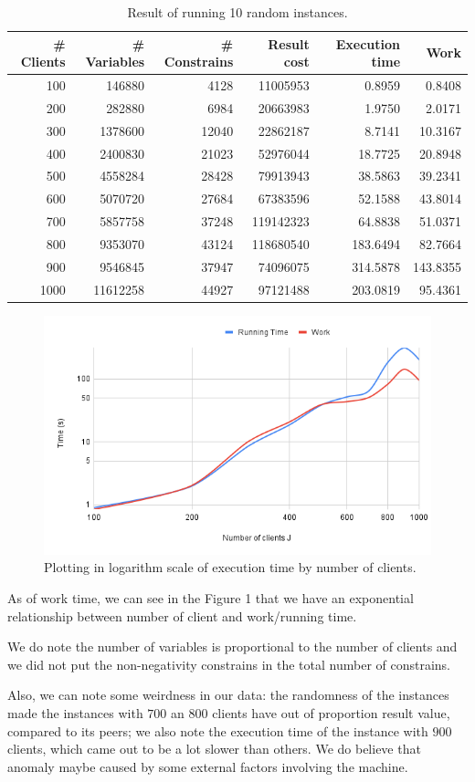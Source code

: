 \documentclass[11pt]{article}
\theoremstyle{definition}
\theoremstyle{definition}
\theoremstyle{remark}
\theoremstyle{remark}
\theoremstyle{remark}
\theoremstyle{remark}
\theoremstyle{definition}
\begin{document}
\begin{table}[htbp]
\caption{Result of running 10 random instances.}
\centering
\begin{tabular}{rrrrrr}
\# Clients & \# Variables & \# Constrains & Result cost & Execution time & Work\\
\hline
100 & 146880 & 4128 & 11005953 & 0.8959 & 0.8408\\
200 & 282880 & 6984 & 20663983 & 1.9750 & 2.0171\\
300 & 1378600 & 12040 & 22862187 & 8.7141 & 10.3167\\
400 & 2400830 & 21023 & 52976044 & 18.7725 & 20.8948\\
500 & 4558284 & 28428 & 79913943 & 38.5863 & 39.2341\\
600 & 5070720 & 27684 & 67383596 & 52.1588 & 43.8014\\
700 & 5857758 & 37248 & 119142323 & 64.8838 & 51.0371\\
800 & 9353070 & 43124 & 118680540 & 183.6494 & 82.7664\\
900 & 9546845 & 37947 & 74096075 & 314.5878 & 143.8355\\
1000 & 11612258 & 44927 & 97121488 & 203.0819 & 95.4361\\
\end{tabular}
\end{table}

\begin{figure}[htbp]
\centering
\includegraphics[width=.9\linewidth]{./chart.png}
\caption{Plotting in logarithm scale of execution time by number of clients.}
\end{figure}

As of work time, we can see in the Figure 1 that we have an exponential relationship between number of client and work/running time.

We do note the number of variables is proportional to the number of clients and we did not put the non-negativity constrains in the total number of constrains.

Also, we can note some weirdness in our data: the randomness of the instances made the instances with \(700\) an \(800\) clients have out of proportion result value, compared to its peers; we also note the execution time of the instance with \(900\) clients, which came out to be a lot slower than others. We do believe that anomaly maybe caused by some external factors involving the machine.
\end{document}
